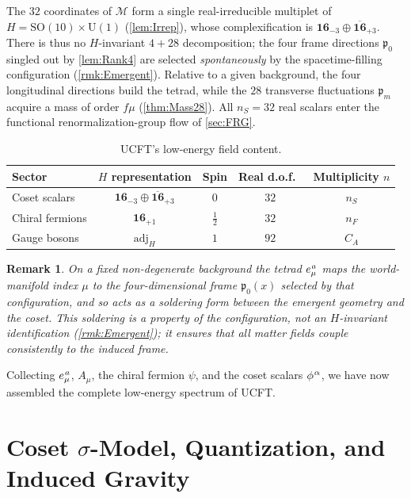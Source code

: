 \documentclass[pdflatex,sn-mathphys-num]{sn-jnl}
\theoremstyle{thmstyleone}
\theoremstyle{thmstyletwo}%
\newtheorem{remark}{Remark}%
\theoremstyle{thmstylethree}%
\newcommand{\SO}[1]{\mathrm{SO(#1)}}
\newcommand{\U}[1]{\mathrm{U(#1)}}
\newcommand{\M}{\mathcal{M}}
\newcommand{\SOTen}{\SO{10}}
\newcommand{\UOne}{\U{1}}
\newcommand{\SOTenXUOne}{\SOTen \times \UOne}
\newcommand{\sm}{\hspace{.065em}}
\newcommand{\smexp}[1]{^{\sm #1}}
\renewcommand{\arraystretch}{1.25}
\begin{document}
The $32$ coordinates of $\M$ form a single real-irreducible multiplet of
$H=\SOTenXUOne$ (\autoref{lem:Irrep}), whose complexification is
\(
  \mathbf{16}_{-3}\oplus\overline{\mathbf{16}}_{+3}.
\)
There is thus no $H$-invariant $4+28$ decomposition; the four frame directions
$\mathfrak p_{0}$ singled out by \autoref{lem:Rank4} are selected
\emph{spontaneously} by the spacetime-filling configuration
(\autoref{rmk:Emergent}). Relative to a given background, the four longitudinal
directions build the tetrad, while the $28$ transverse fluctuations
$\mathfrak p_{m}$ acquire a mass of order $f\mu$
(\autoref{thm:Mass28}). All
\(
  n_{S}=32
\)
real scalars enter the functional renormalization-group flow of
\autoref{sec:FRG}.

\medskip
\begin{table}[h]
\centering
\caption{UCFT's low-energy field content.}
\label{tab:FieldContent}
\renewcommand{\arraystretch}{1.25}
\begin{tabular}{@{}lcccc@{}}
\toprule
Sector & $H$ representation & Spin & Real d.o.f.\ & Multiplicity $n$ \\
\midrule
Coset scalars & $\mathbf{16}_{-3}\oplus\overline{\mathbf{16}}_{+3}$ & $0$ & $32$ & $n_{S}$ \\
Chiral fermions & $\mathbf{16}_{+1}$ & $\tfrac12$ & $32$ & $n_{F}$ \\
Gauge bosons & $\mathrm{adj}_{H}$ & $1$ & $92$ & $C_{A}$ \\
\bottomrule
\end{tabular}
\end{table}

\medskip
\begin{remark}\label{rmk:Soldering}
On a fixed non-degenerate background the tetrad $e_{\mu}\smexp{ a}$ maps the
world-manifold index $\mu$ to the four-dimensional frame $\mathfrak p_{0}(x)$
selected by that configuration, and so acts as a \emph{soldering form} between
the emergent geometry and the coset. This soldering is a property of the
configuration, not an $H$-invariant identification (\autoref{rmk:Emergent}); it
ensures that all matter fields couple consistently to the induced frame.
\end{remark}

Collecting $e_{\mu}\smexp{ a}$, $A_{\mu}$, the chiral fermion
$\psi$, and the coset scalars $\phi\smexp{\alpha}$, we have now assembled the
complete low-energy spectrum of UCFT.

\section{Coset \texorpdfstring{$\sigma$}{Sigma}-Model, Quantization, and Induced Gravity}
\label{sec:sigma}
\end{document}
